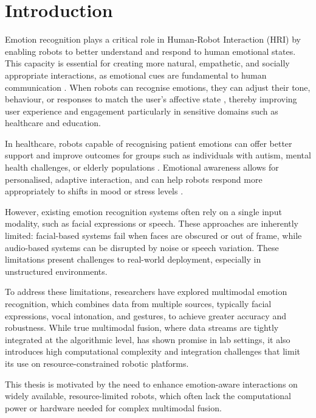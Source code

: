 \chapter{Introduction}

Emotion recognition plays a critical role in Human-Robot Interaction (HRI) by enabling robots to better understand and respond to human emotional states. This capacity is essential for creating more natural, empathetic, and socially appropriate interactions, as emotional cues are fundamental to human communication \cite{Castellano2009-cv}. When robots can recognise emotions, they can adjust their tone, behaviour, or responses to match the user's affective state \cite{Breazeal2003-sa}, thereby improving user experience and engagement particularly in sensitive domains such as healthcare and education.

In healthcare, robots capable of recognising patient emotions can offer better support and improve outcomes for groups such as individuals with autism, mental health challenges, or elderly populations \cite{Dautenhahn2007-wl}. Emotional awareness allows for personalised, adaptive interaction, and can help robots respond more appropriately to shifts in mood or stress levels \cite{Dhuheir2021-ii}.

However, existing emotion recognition systems often rely on a single input modality, such as facial expressions or speech. These approaches are inherently limited: facial-based systems fail when faces are obscured or out of frame, while audio-based systems can be disrupted by noise or speech variation. These limitations present challenges to real-world deployment, especially in unstructured environments.

To address these limitations, researchers have explored multimodal emotion recognition, which combines data from multiple sources, typically facial expressions, vocal intonation, and gestures, to achieve greater accuracy and robustness. While true multimodal fusion, where data streams are tightly integrated at the algorithmic level, has shown promise in lab settings, it also introduces high computational complexity and integration challenges that limit its use on resource-constrained robotic platforms.

This thesis is motivated by the need to enhance emotion-aware interactions on widely available, resource-limited robots, which often lack the computational power or hardware needed for complex multimodal fusion. 

